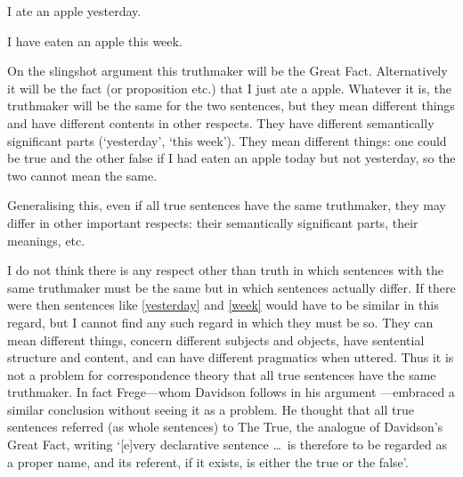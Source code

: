 	\begin{example}\label{yesterday}
	I ate an apple yesterday.
	\end{example}

	\begin{example}\label{week}
	I have eaten an apple this week.
	\end{example}

On the slingshot argument this truthmaker will be the Great Fact.
Alternatively it will be the fact (or proposition etc.) that I just ate a apple.
Whatever it is, the truthmaker will be the same for the two sentences, but they mean different things and have different contents in other respects.
They have different semantically significant parts (`yesterday', `this week').
They mean different things: one could be true and the other false if I had eaten an apple today but not yesterday, so the two cannot mean the same.

Generalising this, even if all true sentences have the same truthmaker, they may differ in other important respects: their semantically significant parts, their meanings, etc.

I do not think there is any respect other than truth in which sentences with the same truthmaker must be the same but in which sentences actually differ. 
If there were then sentences like \ref{yesterday} and \ref{week} would have to be similar in this regard, but I cannot find any such regard in which they must be so.
They can mean different things, concern different subjects and objects, have sentential structure and content, and can have different pragmatics when uttered.
Thus it is not a problem for correspondence theory that all true sentences have the same truthmaker.
In fact Frege---whom Davidson follows in his argument \parencite[750]{Davidson_1969}---embraced a similar conclusion without seeing it as a problem.
He thought that all true sentences referred (as whole sentences) to The True, the analogue of Davidson's Great Fact, writing `[e]very declarative sentence \ldots\ is therefore to be regarded as a proper name, and its referent, if it exists, is either the true or the false'.
\parencite[216]{Frege_1948}


